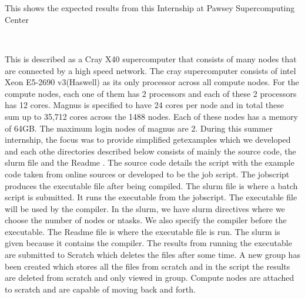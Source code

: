 \begin{Document}

\begin{abstract}




\end{abstract}
\\
\begin{Introduction}





\end{Introduction}
\
\
\\
\begin{scope}

This shows the expected results from this Internship at Pawsey Supercomputing Center
\
\



\end{scope}
\
\\

This is described as a Cray X40 supercomputer that consists of many nodes that are connected by a high speed network. The cray supercomputer consists of intel Xeon E5-2690 v3(Haswell) as its only processor across all compute nodes. For the compute nodes, each one of them has 2 processors and each of these 2 processors has 12 cores.
Magnus is specified to have 24 cores per node and in total these sum up to 35,712 cores across the 1488 nodes. Each of these nodes has a memory of 64GB. The maximum login nodes of magnus are 2.
During this summer internship, the focus was to provide simplified getexamples which we developed and each othe directories described below consists of mainly the source code, the slurm file and the Readme . The source code details the script with the example code taken from online sources or developed to be the job script. The jobscript produces the executable file after being compiled. The slurm file is where a batch script is submitted. It runs the executable from the jobscript. The executable file will be used by the compiler. In the slurm, we have slurm directives where we choose the number of nodes or ntasks. We also specify the compiler before the executable. The Readme file is where the executable file is run. The slurm is given because it contains the compiler. The results from running the executable are submitted to Scratch which deletes the files after some time. A new group has been created which stores all the files from scratch and in the script the results are deleted from scratch and only viewed in group. Compute nodes are attached to scratch and are capable of moving back and forth.


\end{Document}
